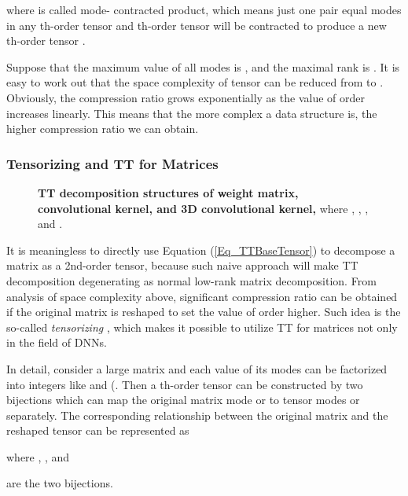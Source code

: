 \documentclass[a4paper,fleqn]{cas-dc}
\begin{document}
where  is called mode- contracted product, which means just one pair equal modes in any th-order tensor  and th-order tensor  will be contracted to produce a new th-order tensor .

Suppose that the maximum value of all modes is , and the maximal rank is . It is easy to work out that the space complexity of tensor  can be reduced from  to . Obviously, the compression ratio grows exponentially as the value of order  increases linearly. This means that the more complex a data structure is, the higher compression ratio we can obtain.

\subsubsection{Tensorizing and TT for Matrices}\quad

\begin{figure*}
\centering
{}
\caption{\textbf{TT decomposition structures of weight matrix, convolutional kernel, and 3D convolutional kernel,} where , , ,  and .}
\label{Fig_tt_structure}
\end{figure*}

It is meaningless to directly use Equation (\ref{Eq_TTBaseTensor}) to decompose a matrix as a 2nd-order tensor, because such naive approach will make TT decomposition degenerating as normal low-rank matrix decomposition. From analysis of space complexity above, significant compression ratio can be obtained if the original matrix is reshaped to set the value of order higher. Such idea is the so-called \emph{tensorizing} \citep{Novikov_2015_TT}, which makes it possible to utilize TT for matrices not only in the field of DNNs.

In detail, consider a large matrix  and each value of its modes can be factorized into  integers like  and  (. Then a th-order tensor  can be constructed by two bijections which can map the original matrix mode  or  to  tensor modes  or  separately. The corresponding relationship between the original matrix and the reshaped tensor can be represented as

where , , and

are the two bijections.
\end{document}
